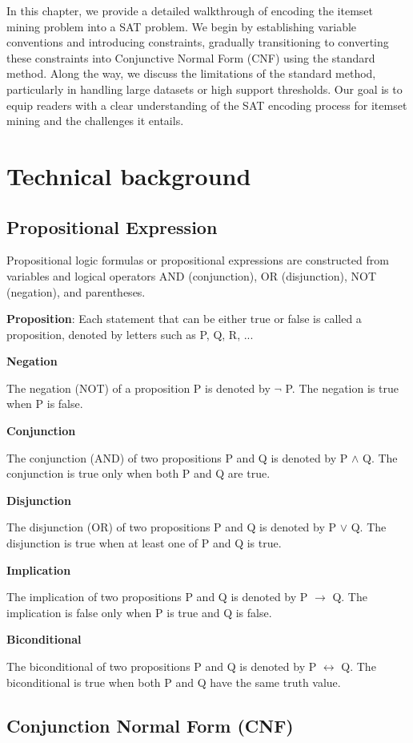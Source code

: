 In this chapter, we provide a detailed walkthrough of encoding the itemset mining problem into a SAT problem.
We begin by establishing variable conventions and introducing constraints, gradually transitioning to converting these constraints into Conjunctive Normal Form (CNF) using the standard method.
Along the way, we discuss the limitations of the standard method, particularly in handling large datasets or high support thresholds.
Our goal is to equip readers with a clear understanding of the SAT encoding process for itemset mining and the challenges it entails.

\section{Technical background}
\subsection{Propositional Expression}
Propositional logic formulas or propositional expressions are constructed from variables
and logical operators AND (conjunction), OR (disjunction), NOT (negation), and
parentheses.

\textbf{Proposition}: Each statement that can be either true or false is called a proposition,
denoted by letters such as P, Q, R, ...

\textbf{Negation}

The negation (NOT) of a proposition P is denoted by $\lnot$ P. The negation
is true when P is false.

\textbf{Conjunction}

The conjunction (AND) of two propositions P and Q is denoted by P
$\land$ Q. The conjunction is true only when both P and Q are true.

\textbf{Disjunction}

The disjunction (OR) of two propositions P and Q is denoted by P $\lor$ Q.
The disjunction is true when at least one of P and Q is true.

\textbf{Implication}

The implication of two propositions P and Q is denoted by P $\rightarrow$ Q.
The implication is false only when P is true and Q is false.

\textbf{Biconditional}

The biconditional of two propositions P and Q is denoted by P $\leftrightarrow$ Q.
The biconditional is true when both P and Q have the same truth value.

\subsection{Conjunction Normal Form (CNF)}

